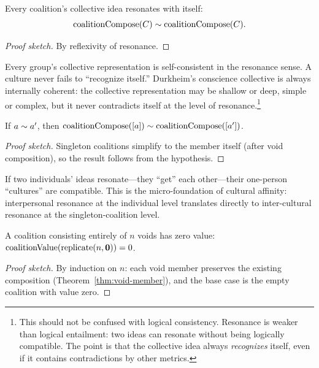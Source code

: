 \begin{theorem}
\label{thm:coal-self-res}
Every coalition's collective idea resonates with itself:
\[
  \operatorname{coalitionCompose}(C) \sim \operatorname{coalitionCompose}(C).
\]
\end{theorem}

\begin{proof}[Proof sketch]
By reflexivity of resonance.
\end{proof}

Every group's collective representation is self-consistent in the resonance
sense.  A culture never fails to ``recognize itself.''  Durkheim's
conscience collective is always internally coherent: the collective
representation may be shallow or deep, simple or complex, but it never
contradicts itself at the level of resonance.\footnote{This should not be
confused with logical consistency.  Resonance is weaker than logical
entailment: two ideas can resonate without being logically compatible.
The point is that the collective idea always \emph{recognizes} itself,
even if it contains contradictions by other metrics.}

\begin{theorem}
\label{thm:resonant-singletons}
If $a \sim a'$, then $\operatorname{coalitionCompose}([a]) \sim
\operatorname{coalitionCompose}([a'])$.
\end{theorem}

\begin{proof}[Proof sketch]
Singleton coalitions simplify to the member itself (after void composition),
so the result follows from the hypothesis.
\end{proof}

If two individuals' ideas resonate---they ``get'' each other---their
one-person ``cultures'' are compatible.  This is the micro-foundation of
cultural affinity: interpersonal resonance at the individual level
translates directly to inter-cultural resonance at the singleton-coalition
level.

\begin{theorem}
\label{thm:void-list}
A coalition consisting entirely of $n$ voids has zero value:
$\operatorname{coalitionValue}(\operatorname{replicate}(n, \mathbf{0})) = 0$.
\end{theorem}

\begin{proof}[Proof sketch]
By induction on $n$: each void member preserves the existing composition
(Theorem~\ref{thm:void-member}), and the base case is the empty coalition
with value zero.
\end{proof}


